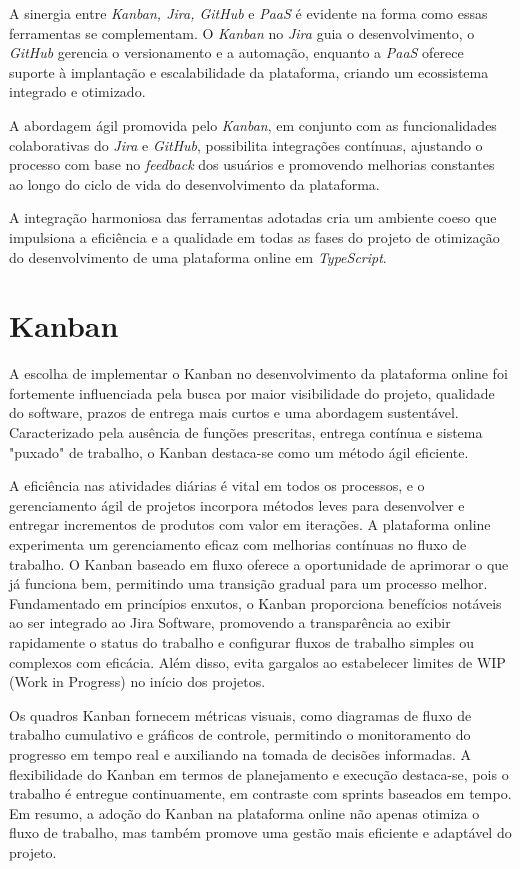 A sinergia entre \textit{Kanban, Jira, GitHub} e \textit{PaaS} é evidente na forma como essas ferramentas se complementam. O \textit{Kanban} no \textit{Jira} guia o desenvolvimento, o \textit{GitHub} gerencia o versionamento e a automação, enquanto a \textit{PaaS} oferece suporte à implantação e escalabilidade da plataforma, criando um ecossistema integrado e otimizado.

A abordagem ágil promovida pelo \textit{Kanban}, em conjunto com as funcionalidades colaborativas do \textit{Jira} e \textit{GitHub}, possibilita integrações contínuas, ajustando o processo com base no \textit{feedback} dos usuários e promovendo melhorias constantes ao longo do ciclo de vida do desenvolvimento da plataforma.

A integração harmoniosa das ferramentas adotadas cria um ambiente coeso que impulsiona a eficiência e a qualidade em todas as fases do projeto de otimização do desenvolvimento de uma plataforma online em \textit{TypeScript}.

\section{%
Kanban}
A escolha de implementar o Kanban no desenvolvimento da plataforma online foi fortemente influenciada pela busca por maior visibilidade do projeto, qualidade do software, prazos de entrega mais curtos e uma abordagem sustentável. Caracterizado pela ausência de funções prescritas, entrega contínua e sistema "puxado" de trabalho, o Kanban destaca-se como um método ágil eficiente.

A eficiência nas atividades diárias é vital em todos os processos, e o gerenciamento ágil de projetos incorpora métodos leves para desenvolver e entregar incrementos de produtos com valor em iterações. A plataforma online experimenta um gerenciamento eficaz com melhorias contínuas no fluxo de trabalho. O Kanban baseado em fluxo oferece a oportunidade de aprimorar o que já funciona bem, permitindo uma transição gradual para um processo melhor. Fundamentado em princípios enxutos, o Kanban proporciona benefícios notáveis ao ser integrado ao Jira Software, promovendo a transparência ao exibir rapidamente o status do trabalho e configurar fluxos de trabalho simples ou complexos com eficácia. Além disso, evita gargalos ao estabelecer limites de WIP (Work in Progress) no início dos projetos.

Os quadros Kanban fornecem métricas visuais, como diagramas de fluxo de trabalho cumulativo e gráficos de controle, permitindo o monitoramento do progresso em tempo real e auxiliando na tomada de decisões informadas. A flexibilidade do Kanban em termos de planejamento e execução destaca-se, pois o trabalho é entregue continuamente, em contraste com sprints baseados em tempo. Em resumo, a adoção do Kanban na plataforma online não apenas otimiza o fluxo de trabalho, mas também promove uma gestão mais eficiente e adaptável do projeto.

